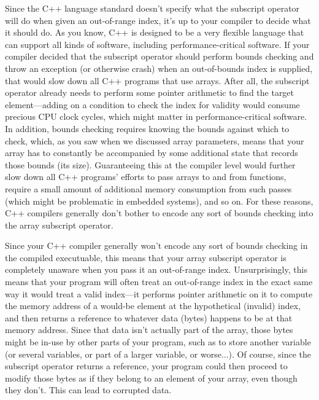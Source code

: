 \documentclass{article}
\begin{document}
Since the C++ language standard doesn't specify what the subscript operator will do when given an out-of-range index, it's up to your compiler to decide what it should do. As you know, C++ is designed to be a very flexible language that can support all kinds of software, including performance-critical software. If your compiler decided that the subscript operator should perform bounds checking and throw an exception (or otherwise crash) when an out-of-bounds index is supplied, that would slow down all C++ programs that use arrays. After all, the subscript operator already needs to perform some pointer arithmetic to find the target element---adding on a condition to check the index for validity would consume precious CPU clock cycles, which might matter in performance-critical software. In addition, bounds checking requires knowing the bounds against which to check, which, as you saw when we discussed array parameters, means that your array has to constantly be accompanied by some additional state that records those bounds (its size). Guaranteeing this at the compiler level would further slow down all C++ programs' efforts to pass arrays to and from functions, require a small amount of additional memory consumption from such passes (which might be problematic in embedded systems), and so on. For these reasons, C++ compilers generally don't bother to encode any sort of bounds checking into the array subscript operator.

Since your C++ compiler generally won't encode any sort of bounds checking in the compiled executuable, this means that your array subscript operator is completely unaware when you pass it an out-of-range index. Unsurprisingly, this means that your program will often treat an out-of-range index in the exact same way it would treat a valid index---it performs pointer arithmetic on it to compute the memory address of a would-be element at the hypothetical (invalid) index, and then returns a reference to whatever data (bytes) happens to be at that memory address. Since that data isn't actually part of the array, those bytes might be in-use by other parts of your program, such as to store another variable (or several variables, or part of a larger variable, or worse...). Of course, since the subscript operator returns a reference, your program could then proceed to modify those bytes as if they belong to an element of your array, even though they don't. This can lead to corrupted data.
\end{document}
